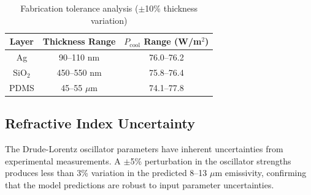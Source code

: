\begin{table}[htbp]
  \centering
  \caption{Fabrication tolerance analysis ($\pm$10\% thickness variation)}
  \label{tab:fabrication}
  \begin{tabular}{c|c|c}
    \toprule
    \textbf{Layer} & \textbf{Thickness Range} & $P_{\text{cool}}$ Range (W/m$^2$) \\
    \midrule
    Ag & 90--110 nm & 76.0--76.2 \\
    SiO$_2$ & 450--550 nm & 75.8--76.4 \\
    PDMS & 45--55 $\mu$m & 74.1--77.8 \\
    \bottomrule
  \end{tabular}
\end{table}

\subsection{Refractive Index Uncertainty}

The Drude-Lorentz oscillator parameters have inherent uncertainties from experimental measurements. A $\pm$5\% perturbation in the oscillator strengths produces less than 3\% variation in the predicted 8--13 $\mu$m emissivity, confirming that the model predictions are robust to input parameter uncertainties.
